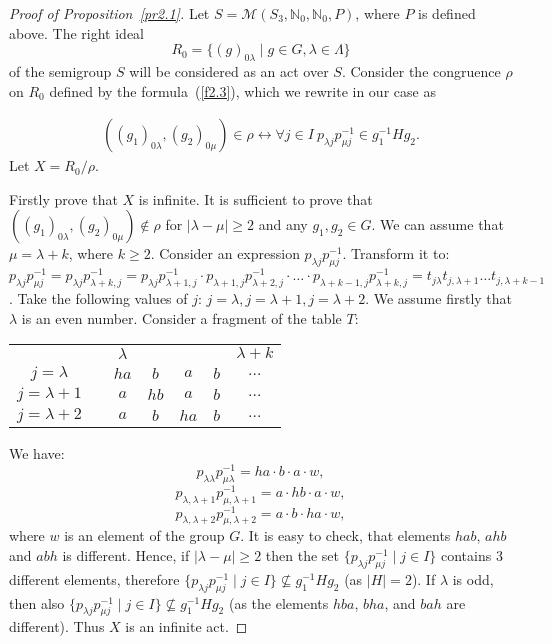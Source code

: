 \documentclass{birkau}
\numberwithin{equation}{section}
\theoremstyle{plain}
\theoremstyle{definition}
\begin{document}
\begin{proof}[Proof of Proposition~\ref{pr2.1}]
    	Let $S = \mathcal{M}(S_3,\mathbb{N}_0,\mathbb{N}_0,P)$, where $P$ is defined above. The right ideal $$ R_0 = \{ (g)_{0 \lambda} \mid g \in G, \lambda \in \Lambda \} $$ of the semigroup $S$ will be considered as an act over $S$. Consider the congruence $\rho$ on $R_0$ defined by the formula~(\ref{f2.3}), which we rewrite in our case as
    	
    	\begin{gather*}
    		((g_1)_{0 \lambda},(g_2)_{0 \mu}) \in \rho \leftrightarrow \forall j \in I \ p_{\lambda j} p_{\mu j}^{-1} \in g_1^{-1} H g_2. \label{f2.4}
    	\end{gather*}
    	Let $X = {R_0}/{\rho}$.
	
	    Firstly prove that $X$ is infinite. It is sufficient to prove that \newline  $((g_1)_{0 \lambda},(g_2)_{0 \mu}) \notin \rho$ for $|\lambda - \mu| \geqslant 2$ and any $g_1,g_2 \in G$. We can assume that $\mu = \lambda + k$, where $k \geqslant 2$. Consider an expression $p_{\lambda j} p_{\mu j}^{-1}$. Transform it to: $p_{\lambda j} p_{\mu j}^{-1} = p_{\lambda j} p_{\lambda + k, j}^{-1} = p_{\lambda j} p_{\lambda + 1, j}^{-1} \cdot p_{\lambda + 1,j} p_{\lambda + 2,j}^{-1} \cdot \ldots \cdot p_{\lambda + k - 1,j} p_{\lambda + k,j}^{-1} = t_{j \lambda}t_{j,\lambda+1} \ldots t_{j, \lambda + k - 1}$. Take the following values of $j$: $j = \lambda, j = \lambda + 1, j = \lambda + 2$. We assume firstly that $\lambda$ is an even number. Consider a fragment of the table $T$:
		\begin{center}
			\begin{tabular}{ccccccc}
					& & $\lambda$ & & & & $\lambda + k $ \\
				$j = \lambda$ & & $ha$ & $b$ & $a$ & $b$ & $\dots$ \\
				$j = \lambda+1$ & & $a$ & $hb$ & $a$ & $b$ & $\dots$ \\
				$j = \lambda+2$ & & $a$ & $b$ & $ha$ & $b$ & $\dots$
			\end{tabular}
		\end{center}
		
		We have: $$p_{\lambda \lambda} p_{\mu \lambda}^{-1} = ha \cdot b \cdot a \cdot w,$$ $$p_{\lambda, \lambda+1} p_{\mu, \lambda+1}^{-1} =a \cdot hb \cdot a \cdot w,$$ $$p_{\lambda, \lambda+2} p_{\mu, \lambda+2}^{-1} =a \cdot b \cdot ha \cdot w,$$ where $w$ is an element of the group $G$. It is easy to check, that elements $hab$, $ahb$ and $abh$ is different. Hence, if $|\lambda - \mu| \geqslant 2$ then the set $\{ p_{\lambda j} p_{\mu j}^{-1} \mid j \in I \}$ contains 3 different elements, therefore $\{ p_{\lambda j} p_{\mu j}^{-1} \mid j \in I \} \not \subseteq g^{-1}_1 H g_2$ (as $|H|=2$). If $\lambda$ is odd, then also $\{ p_{\lambda j} p_{\mu j}^{-1} \mid j \in I \} \not \subseteq g_1^{-1} H g_2$ (as the elements $hba$, $bha$, and $bah$ are different). Thus $X$ is an infinite act.
		

\end{proof}
\end{document}
